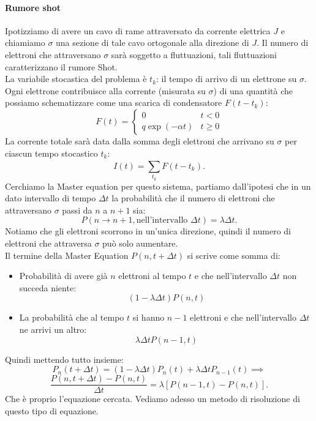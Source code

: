 \paragraph{Rumore shot}%
Ipotizziamo di avere un cavo di rame attraversato da corrente elettrica $J$ e chiamiamo $\sigma$ una sezione di tale cavo ortogonale alla direzione di $J$. Il numero di elettroni che attraversano $\sigma$ sarà soggetto a fluttuazioni, tali fluttuazioni caratterizzano il rumore Shot.\\
La variabile stocastica del problema è $t_k$: il tempo di arrivo di un elettrone su $\sigma$. Ogni elettrone contribuisce alla corrente (misurata su $\sigma$) di una quantità che possiamo schematizzare come una scarica di condensatore $F(t-t_k)$:
\[
    F(t) = \begin{cases}
	0	 			&t<0\\
	q \exp\left(-\alpha t\right) 	&t \ge 0
    \end{cases}
\] 
La corrente totale sarà data dalla somma degli elettroni che arrivano su $\sigma$ per ciascun tempo stocastico $t_k$:
\[
    I(t) = \sum_{t_k}^{} F(t-t_k) 
.\] 
Cerchiamo la Master equation per questo sistema, partiamo dall'ipotesi che in un dato intervallo di tempo $\Delta t$ la probabilità che il numero di elettroni che attraversano $\sigma$ passi da $n$ a $n+1$ sia:
\[
    P(n\to n+1, \text{nell'intervallo }\Delta  t) = \lambda \Delta t
.\] 
Notiamo che gli elettroni scorrono in un'unica direzione, quindi il numero di elettroni che attraversa $\sigma$ può solo aumentare.\\
Il termine della Master Equation $P(n, t + \Delta t)$ si scrive come somma di:
\begin{itemize}
    \item Probabilità di avere già $n$ elettroni al tempo $t$ e che nell'intervallo $\Delta t$ non succeda niente:
	\[
	    (1-\lambda \Delta t) P(n, t)
	\]
    \item La probabilità che al tempo $t$ si hanno $n-1$ elettroni e che nell'intervallo $\Delta t$ ne arrivi un altro:
	\[
	    \lambda \Delta t P(n-1, t)
	\]
\end{itemize}
Quindi mettendo tutto insieme:
\[
    P_n(t+\Delta  t) = \left(1-\lambda\Delta t\right)P_n(t) + \lambda\Delta t  P_{n-1}(t)\implies 
\] 
\[
	\frac{P(n, t+\Delta  t) - P(n,t)}{\Delta t} = \lambda\left[P(n-1,t) -P(n,t)\right] 
.\] 
Che è proprio l'equazione cercata. Vediamo adesso un metodo di risoluzione di questo tipo di equazione.

